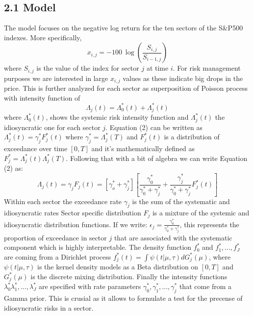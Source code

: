\documentclass[fleqn, a4paper]{report}
\begin{document}
\subsection*{2.1 Model}
The model focuses on the negative log return for the ten sectors of the S\&P500 indexes. More specifically, 
\begin{equation}
x_{i,j} = -100~\log(\frac{S_{i,j}}{S_{i-1,j}})
\end{equation}
where $S_{i,j}$ is the value of the index for sector $j$ at time $i$. For risk management purposes we are interested in large $x_{i,j}$ values as these indicate big drops in the price. This is further analyzed for each sector as superposition of Poisson process with intensity function of 
\begin{equation}
\Lambda_j(t) = \Lambda_0^*(t) + \Lambda_j^*(t)
\end{equation}
where $\Lambda_0^*(t)$, shows the systemic risk intensity function and $\Lambda_j^*(t)$ the idiosyncratic one for each sector $j$. Equation (2) can be written as $\Lambda_j^*(t) = \gamma_j^*F_j^*(t)$ where $\gamma_j^* = \Lambda_j^*(T)$ and $F_j^*(t)$ is a distribution of exceedance over time $[0,T]$ and it's mathematically defined as $F_j^* = {\Lambda_j^*(t)}{\Lambda_j^*(T)}$. Following that with a bit of algebra we can write Equation (2) as:
\begin{equation}
\Lambda_j(t) = \gamma_jF_j(t) = [\gamma_o^* + \gamma_j^*][\frac{\gamma_0^*}{\gamma_0^* +\gamma_j^*} + \frac{\gamma_j^*}{\gamma_0^* +\gamma_j^*}F_j^*(t)]
\end{equation}
Within each sector the exceedance rate $\gamma_j$ is the sum of the systematic and idiosyncratic rates
Sector specific distribution $F_j$ is a mixture of the systemic and idiosyncratic distribution functions.
If we write: $\epsilon_j=\frac{\gamma_0^*}{\gamma_0^* +\gamma_j^*}$, this represents the proportion of exceedance in sector $j$  that are associated with the systematic component which is highly interpretable. The density function $f_0^*$ and $f_1^*, ..., f_J^*$ are coming from a Dirichlet process $f_j^*(t) = \int\psi(t|\mu, \tau)dG_j^*(\mu)$, where $\psi(t|\mu, \tau)$ is the kernel density models as a Beta distribution on $[0,T]$ and $G_j^*(\mu)$ is the discrete mixing distribution. Finally the intensity functions $\lambda_0^* \lambda_1^*, ..., \lambda_J^*$ are specified with rate parameters $\gamma_0^*, \gamma_1^*,...,\gamma_j^*$ that come from a Gamma prior. This is crusial as it allows to formulate a test for the precense of idiosyncratic risks in a sector. 
\end{document}
